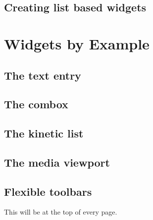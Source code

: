 \documentclass[12pt,a4paper,english]{book}
\begin{document}
\section{Creating list based widgets}



\hypertarget{widgets-by-example}{}
\chapter{Widgets by Example}



\hypertarget{the-text-entry}{}
\section{The text entry}



\hypertarget{the-combox}{}
\section{The combox}



\hypertarget{the-kinetic-list}{}
\section{The kinetic list}



\hypertarget{the-media-viewport}{}
\section{The media viewport}



\hypertarget{flexible-toolbars}{}
\section{Flexible toolbars}

\begin{center}\small

This will be at the top of every page.

\end{center}
\end{document}
